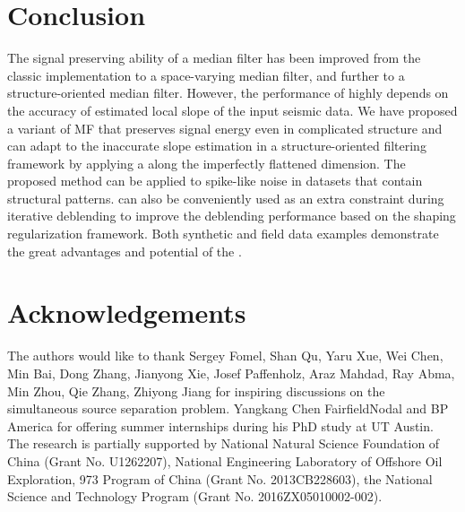 \section{Conclusion}
The signal preserving ability of a median filter has been improved from the classic implementation to a space-varying median filter, and further to a structure-oriented median filter. However, the performance of  highly depends on the accuracy of estimated local slope of the input seismic data. We have proposed a variant of MF that preserves signal energy even in  complicated structure\wen{,} and can adapt to the inaccurate slope estimation in a structure-oriented filtering framework by applying a  along the imperfectly flattened dimension. The proposed method can be applied to  spike-like noise in datasets that contain structural patterns.   can also be conveniently used as an extra constraint during iterative deblending to improve the deblending performance based on the shaping regularization framework. Both synthetic and field data examples demonstrate the great advantages and potential of the .


\section{Acknowledgements}
The authors would like to thank Sergey Fomel, Shan Qu, Yaru Xue, Wei Chen, Min Bai, Dong Zhang, Jianyong Xie, Josef Paffenholz, Araz Mahdad, Ray Abma, Min Zhou, Qie Zhang,  Zhiyong Jiang for inspiring discussions on the simultaneous source separation problem. Yangkang Chen  FairfieldNodal and BP America for offering summer internships during his PhD study at UT Austin. %
 The research is partially supported by National Natural Science Foundation of China (Grant No. U1262207), National Engineering Laboratory of Offshore Oil Exploration, 973 Program of China (Grant No. 2013CB228603),  the National Science and Technology Program (Grant No. 2016ZX05010002-002).


